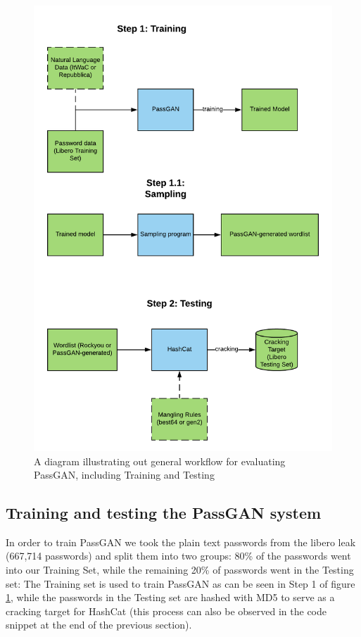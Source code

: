 \begin{figure}[H]
\centering
    \includegraphics[scale=0.8]{figures/testing_flowchart.png}
    \caption{A diagram illustrating out general workflow for evaluating PassGAN, including Training and Testing}
    \label{fig:testing_flowchart}
\end{figure}    

\subsection{Training and testing the PassGAN system}
In order to train PassGAN we took the plain text passwords from the libero leak (667,714 passwords) and split them into two groups: 80\% of the passwords went into our Training Set, while the remaining 20\% of passwords went in the Testing set: The Training set is used to train PassGAN as can be seen in Step 1 of figure \ref{fig:testing_flowchart}, while the passwords in the Testing set are hashed with MD5 to serve as a cracking target for HashCat (this process can also be observed in the code snippet at the end of the previous section).

